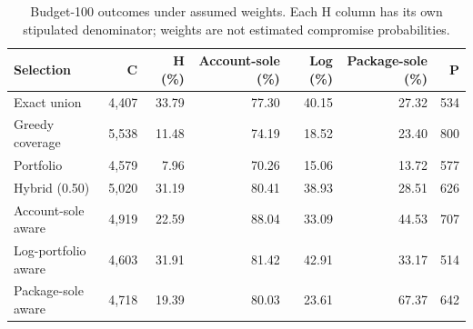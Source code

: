 \begin{table}[t]
\centering
\footnotesize
\caption{Budget-100 outcomes under assumed weights. Each H column has its own stipulated denominator; weights are not estimated compromise probabilities.}
\label{tab:q1_heterogeneous_weights}
\begin{tabular}{lrrrrrr}
\toprule
Selection & C & H (\%) & Account-sole (\%) & Log (\%) & Package-sole (\%) & P\\
\midrule
Exact union & 4,407 & 33.79 & 77.30 & 40.15 & 27.32 & 534\\
Greedy coverage & 5,538 & 11.48 & 74.19 & 18.52 & 23.40 & 800\\
Portfolio & 4,579 & 7.96 & 70.26 & 15.06 & 13.72 & 577\\
Hybrid (0.50) & 5,020 & 31.19 & 80.41 & 38.93 & 28.51 & 626\\
Account-sole aware & 4,919 & 22.59 & 88.04 & 33.09 & 44.53 & 707\\
Log-portfolio aware & 4,603 & 31.91 & 81.42 & 42.91 & 33.17 & 514\\
Package-sole aware & 4,718 & 19.39 & 80.03 & 23.61 & 67.37 & 642\\
\bottomrule
\end{tabular}
\end{table}
